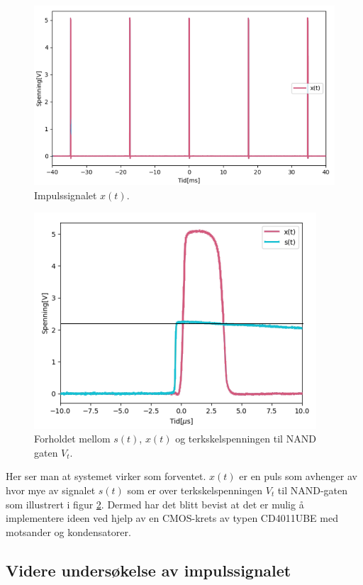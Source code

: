 \begin{figure}[!hbt]
	\centering
	\includegraphics[scale=0.3]{./Images/02Concept/06plotimpuls.png}
	\caption{Impulssignalet $x(t)$.}
    \label{fig:Impulssignalet}
\end{figure}

\begin{figure}[!hbt]
	\centering
	\includegraphics[scale=0.5]{./Images/02Concept/07beggeplotimpulsogmer.png}
	\caption{Forholdet mellom $s(t)$, $x(t)$ og terkskelspenningen til NAND gaten $V_t$.}
    \label{fig:Forholdet}
\end{figure}

Her ser man at systemet virker som forventet. $x(t)$  er en puls som avhenger av hvor mye av signalet $s(t)$ som er over terkskelspenningen $V_t$ til NAND-gaten som illustrert i figur \ref{fig:Forholdet}. Dermed har det blitt bevist at det er mulig å implementere ideen ved hjelp av en CMOS-krets av typen CD4011UBE med motsander og kondensatorer.

\subsection{Videre undersøkelse av impulssignalet}
\label{videre_undersøkelse}

